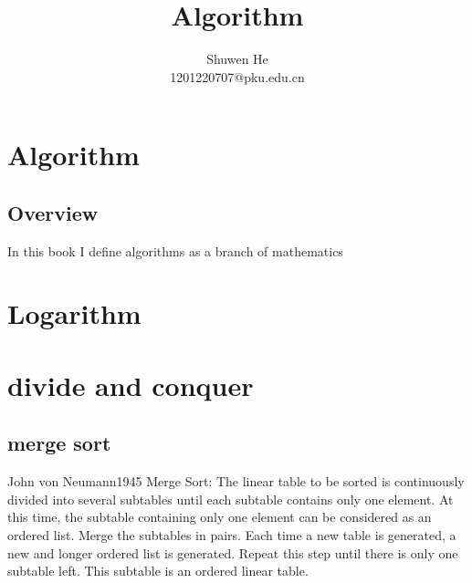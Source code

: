 \documentclass[oneside,12pt,twiside,a4paper]{ctexbook}
\begin{document}
\author
{
Shuwen He\\
1201220707@pku.edu.cn\\
}

\title{Algorithm}
\maketitle
\tableofcontents


%
\chapter{Algorithm}
\section{Overview}
In this book I define algorithms as a branch of mathematics

%
\chapter{Logarithm}

%
\chapter{divide and conquer}
%
\section{merge sort}
John von Neumann1945
Merge Sort:
The linear table to be sorted is continuously divided into several subtables until each 
subtable contains only one element. 
At this time, the subtable containing only one element can be considered as an ordered list.
Merge the subtables in pairs. Each time a new table is generated, 
a new and longer ordered list is generated. 
Repeat this step until there is only one subtable left. 
This subtable is an ordered linear table.
%
\end{document}
